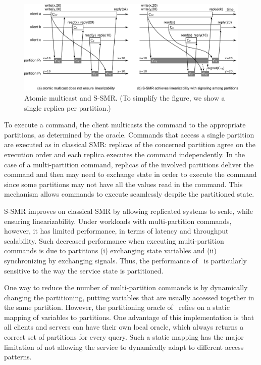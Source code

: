\begin{figure}
  \begin{minipage}[b]{1.0\linewidth}
  \centering
        \includegraphics[width=1\linewidth]{figures/ssmr}
  \end{minipage}
  \caption{Atomic multicast and S-SMR. (To simplify the figure, we show a single replica per partition.)}
  \label{fig:ssmr}
\end{figure}

To execute a command, the client multicasts the command to the appropriate
partitions, as determined by the oracle. Commands that access a single partition
are executed as in classical SMR: replicas of the concerned partition agree on
the execution order and each replica executes the command independently. In the
case of a multi-partition command, replicas of the involved partitions deliver
the command and then may need to exchange state in order to execute the command
since some partitions may not have all the values read in the command. This
mechanism allows commands to execute seamlessly despite the partitioned state.

S-SMR improves on classical SMR by allowing replicated systems to scale, while
ensuring linearizability. Under workloads with multi-partition commands,
however, it has limited performance, in terms of latency and throughput
scalability. Such decreased performance when executing multi-partition commands
is due to partitions (i) exchanging state variables and (ii) synchronizing by
exchanging signals. Thus, the performance of \ssmr\ is particularly
sensitive to the way the service state is partitioned.

One way to reduce the number of multi-partition commands is by dynamically
changing the partitioning, putting variables that are usually accessed together
in the same partition. However, the partitioning oracle of \ssmr\ relies on a
static mapping of variables to partitions. One advantage of this implementation
is that all clients and servers can have their own local oracle, which always
returns a correct set of partitions for every query. Such a static mapping has
the major limitation of not allowing the service to dynamically adapt to
different access patterns.

